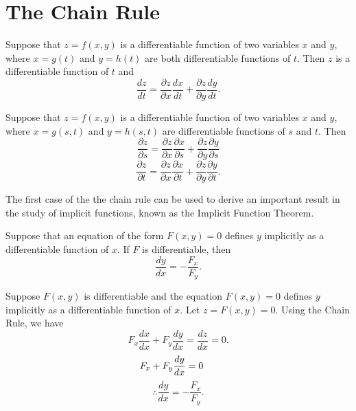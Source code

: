 \documentclass{article}
\begin{document}
\section{The Chain Rule}
\begin{theorem}
    Suppose that $z=f(x,y)$ is a differentiable function of two variables $x$ and $y$, where $x=g(t)$ and $y=h(t)$ are both differentiable functions of $t$. Then $z$ is a differentiable function of $t$ and 
    $$\frac{dz}{dt}=\frac{\partial z}{\partial x}\frac{dx}{dt}+\frac{\partial z}{\partial y}\frac{dy}{dt}.$$
\end{theorem}
\begin{theorem}
    Suppose that $z=f(x,y)$ is a differentiable function of two variables $x$ and $y$, where $x=g(s,t)$ and $y=h(s,t)$ are differentiable functions of $s$ and $t$. Then
    $$\frac{\partial z}{\partial s}=\frac{\partial z}{\partial x}\frac{\partial x}{\partial s}+\frac{\partial z}{\partial y}\frac{\partial y}{\partial s}$$
    $$\frac{\partial z}{\partial t}=\frac{\partial z}{\partial x}\frac{\partial x}{\partial t}+\frac{\partial z}{\partial y}\frac{\partial y}{\partial t}.$$
\end{theorem}
The first case of the the chain rule can be used to derive an important result in the study of implicit functions, known as the Implicit Function Theorem.
\begin{theorem}
    Suppose that an equation of the form $F(x,y)=0$ defines $y$ implicitly as a differentiable function of $x$. If $F$ is differentiable, then 
    $$\frac{dy}{dx}=-\frac{F_x}{F_y}.$$
\end{theorem}
\begin{replacementproof}
    Suppose $F(x,y)$ is differentiable and the equation $F(x,y)=0$ defines $y$ implicitly as a differentiable function of $x$. Let $z=F(x,y)=0.$ Using the Chain Rule, we have
    $$F_x\frac{dx}{dx}+F_y\frac{dy}{dx}=\frac{dz}{dx}=0.$$
    $$F_x+F_y\frac{dy}{dx}=0\hspace{0.5cm}$$
    $$\therefore \frac{dy}{dx}=-\frac{F_x}{F_y}.$$
\end{replacementproof}
\end{document}
